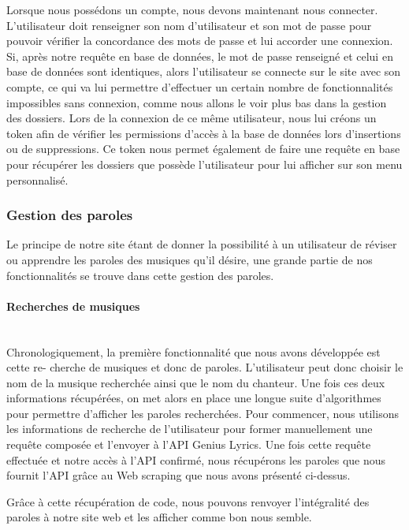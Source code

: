 \documentclass[12pt,french]{article}
\begin{document}
Lorsque nous possédons un compte, nous devons maintenant nous connecter. L'utilisateur doit renseigner son nom d'utilisateur et son mot de passe pour pouvoir vérifier la concordance des mots de passe et lui accorder une connexion. Si, après notre requête en base de données, le mot de passe renseigné et celui en base de données sont identiques, alors l'utilisateur se connecte sur le site avec son compte, ce qui va lui permettre d'effectuer un certain nombre de fonctionnalités impossibles sans connexion, comme nous allons le voir plus bas dans la gestion des dossiers. Lors de la connexion de ce même utilisateur, nous lui créons un \gls{token} afin de vérifier les permissions d'accès à la base de données lors d'insertions ou de suppressions. Ce \gls{token} nous permet également de faire une requête en base pour récupérer les dossiers que possède l'utilisateur pour lui afficher sur son menu personnalisé.

\subsubsection{Gestion des paroles}

Le principe de notre site étant de donner la possibilité à un utilisateur de réviser ou apprendre les paroles des musiques qu'il désire, une grande partie de nos fonctionnalités se trouve dans cette gestion des paroles. 

\paragraph{Recherches de musiques \\\\}

Chronologiquement, la première fonctionnalité que nous avons développée est cette re- cherche de musiques et donc de paroles. L'utilisateur peut donc choisir le nom de la musique recherchée ainsi que le nom du chanteur. Une fois ces deux informations récupérées, on met alors en place une longue suite d'algorithmes pour permettre d'afficher les paroles recherchées. Pour commencer, nous utilisons les informations de recherche de l'utilisateur pour former manuellement une requête composée et l'envoyer à l'\gls{API} Genius Lyrics. Une fois cette requête effectuée et notre accès à l'\gls{API} confirmé, nous récupérons les paroles que nous fournit l'\gls{API} grâce au \gls{Web scraping} que nous avons présenté ci-dessus. 

\newpage

\noindent
Grâce à cette récupération de code, nous pouvons renvoyer l'intégralité des paroles à notre site web et les afficher comme bon nous semble.
\end{document}
